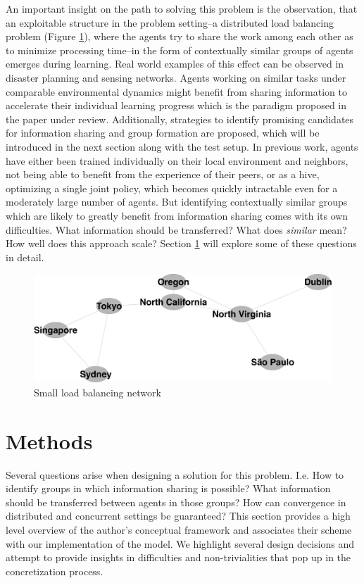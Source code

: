 \documentclass[letterpaper]{article}
\begin{document}
An important insight on the path to solving this problem is the observation, that an exploitable structure in the problem setting--a distributed load balancing problem (Figure \ref{fig:loadbalancing}), where the agents try to share the work among each other as to minimize processing time--in the form of contextually similar groups of agents emerges during learning. Real world examples of this effect can be observed in disaster planning and sensing networks. Agents working on similar tasks under comparable environmental dynamics might benefit from sharing information to accelerate their individual learning progress which is the paradigm proposed in the paper under review. Additionally, strategies to identify promising candidates for information sharing and group formation are proposed, which will be introduced in the next section along with the test setup. In previous work, agents have either been trained individually on their local environment and neighbors, not being able to benefit from the experience of their peers, or as a hive, optimizing a single joint policy, which becomes quickly intractable even for a moderately large number of agents. But identifying contextually similar groups which are likely to greatly benefit from information sharing comes with its own difficulties. What information should be transferred? What does \textit{similar} mean? How well does this approach scale? Section \ref{sec:methods} will explore some of these questions in detail.
\begin{figure}[ht]
 \begin{center}
  \includegraphics[width=.7\linewidth]{figures/loadbalancing}
  \caption{Small load balancing network \citep{garant2015accelerating}}
  \label{fig:loadbalancing}
 \end{center}
\end{figure}

\section{Methods} \label{sec:methods}
Several questions arise when designing a solution for this problem. I.e. How to identify groups in which information sharing is possible? What information should be transferred between agents in those groups? How can convergence in distributed and concurrent settings be guaranteed? This section provides a high level overview of the author’s conceptual framework and associates their scheme with our implementation of the model.  We highlight several design decisions and attempt to provide insights in difficulties and non-trivialities that pop up in the concretization process.
\end{document}
